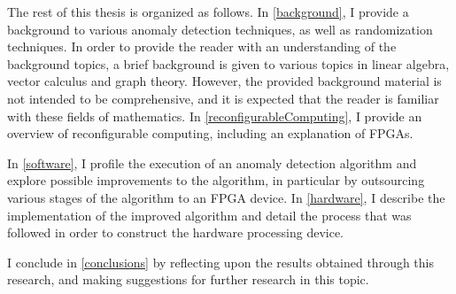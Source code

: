 The rest of this thesis is organized as follows. In \autoref{background}, I
provide a background to various anomaly detection techniques, as well as
randomization techniques. In order to provide the reader with an understanding
of the background topics, a brief background is given to various topics in
linear algebra, vector calculus and graph theory. However, the provided
background material is not intended to be comprehensive, and it is expected that
the reader is familiar with these fields of mathematics. In
\autoref{reconfigurableComputing}, I provide an overview of reconfigurable
computing, including an explanation of \glspl{FPGA}.

In \autoref{software}, I profile the execution of an anomaly detection algorithm
and explore possible improvements to the algorithm, in particular by outsourcing
various stages of the algorithm to an FPGA device. In \autoref{hardware},
I describe the implementation of the improved algorithm and detail the process
that was followed in order to construct the hardware processing device.
\begin{comment}
In \autoref{results}, I record results obtained by benchmarking the device that
was previously designed and constructed, and comparing the expected improvements
to the algorithm's execution with the measured results.
\end{comment}

I conclude in \autoref{conclusions} by reflecting upon the results obtained
through this research, and making suggestions for further research in this
topic.